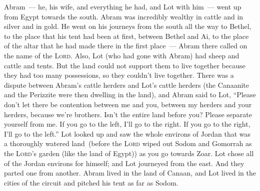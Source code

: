 
\begin{inparaenum}
     Abram~--- he, his wife, and everything he had, and Lot with him~--- went up from Egypt towards the south.%
     Abram was incredibly wealthy in cattle and in silver and in gold.%
     He went on his journeys from the south all the way to Bethel, to the place that his tent had been at first, between Bethel and Ai,%
     to the place of the altar that he had made there in the first place~--- Abram there called on the name of the \textsc{Lord}.%
     Also, Lot (who had gone with Abram) had sheep and cattle and tents.%
     But the land could not support them to live together because they had too many possessions, so they couldn't live together.%
     There was a dispute between Abram's cattle herders and Lot's cattle herders (the Canaanite and the Perizzite were then dwelling in the land),%
     and Abram said to Lot, ``Please don't let there be contention between me and you, between my herders and your herders, because we're brothers.%
     Isn't the entire land before you? Please separate yourself from me. If you go to the left, I'll go to the right. If you go to the right, I'll go to the left.''%
     Lot looked up and saw the whole environs of Jordan that was a thoroughly watered land\understood\ (before the \textsc{Lord} wiped out Sodom and Gomorrah as the \textsc{Lord}'s garden (like the land of Egypt)) as you go towards Zoar.%
     Lot chose all of the Jordan environs for himself; and Lot journeyed from the east. And they parted one from another.%
     Abram lived in the land of Canaan, and Lot lived in the cities of the circuit and pitched his tent as far as Sodom.%
\end{inparaenum}
